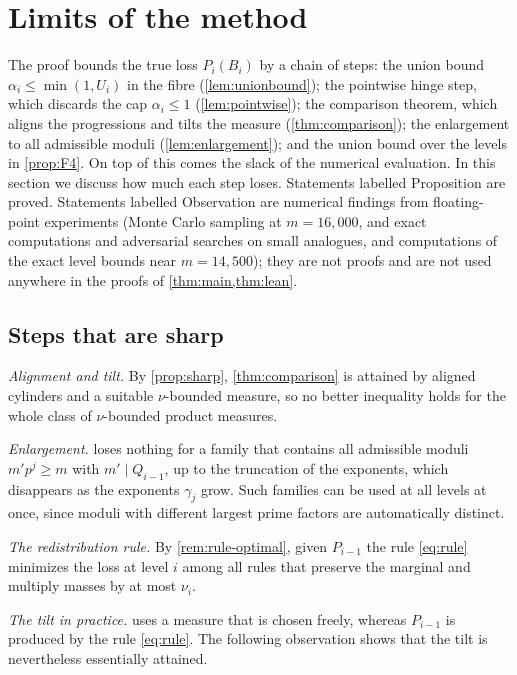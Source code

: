 \section{Limits of the method}\label{sec:limits}

The proof bounds the true loss $P_i(B_i)$ by a chain of steps: the union bound $\alpha_i\le\min(1,U_i)$ in the fibre
(\cref{lem:unionbound}); the pointwise hinge step, which discards the cap $\alpha_i\le1$ (\cref{lem:pointwise});
the comparison theorem, which aligns the progressions and tilts the measure (\cref{thm:comparison}); the enlargement
to all admissible moduli (\cref{lem:enlargement}); and the union bound over the levels in \cref{prop:F4}. On top of
this comes the slack of the numerical evaluation. In this section we discuss how much each step loses. Statements
labelled Proposition are proved. Statements labelled Observation are numerical findings from floating-point
experiments (Monte Carlo sampling at $m=16{,}000$, and exact computations and adversarial searches on small
analogues, and computations of the exact level bounds near $m=14{,}500$); they are not proofs and are not used
anywhere in the proofs of \cref{thm:main,thm:lean}.

\subsection{Steps that are sharp}

\emph{Alignment and tilt.} By \cref{prop:sharp}, \cref{thm:comparison} is attained by aligned cylinders and a
suitable $\nu$-bounded measure, so no better inequality holds for the whole class of $\nu$-bounded product measures.

\emph{Enlargement.}  loses nothing for a family that contains all admissible moduli
$m'p^j\ge m$ with $m'\mid Q_{i-1}$, up to the truncation of the exponents, which disappears as the exponents
$\gamma_j$ grow. Such families can be used at all levels at once, since moduli with different largest prime factors
are automatically distinct.

\emph{The redistribution rule.} By \cref{rem:rule-optimal}, given $P_{i-1}$ the rule \eqref{eq:rule} minimizes the
loss at level $i$ among all rules that preserve the marginal and multiply masses by at most $\nu_i$.

\emph{The tilt in practice.}  uses a measure that is chosen freely, whereas $P_{i-1}$ is produced
by the rule \eqref{eq:rule}. The following observation shows that the tilt is nevertheless essentially attained.

